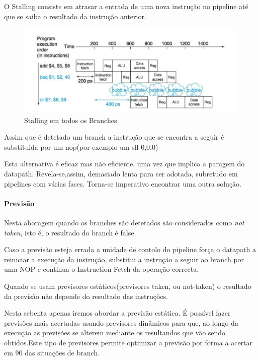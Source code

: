 \documentclass[10pt,a4paper]{book}
\begin{document}
				O Stalling consiste em atrasar a entrada de uma nova instrução no pipeline até que se saiba o resultado da instrução anterior.
        \begin{figure}[htp]
            \centering
            \includegraphics[scale=0.4]{pipeline2.png}
            \caption{Stalling em todos os Branches}
            \label{Stalling}
        \end{figure}
				Assim que é detetado um branch a instrução que se encontra a seguir é substituida por um nop(por exemplo um sll 0,0,0)

				Esta alternativa é eficaz mas não eficiente, uma vez que implica a paragem do datapath. Revela-se,assim, demasiado lenta para ser adotada, subretudo em pipelines com várias fases.
				Torna-se imperativo encontrar uma outra solução.

			\paragraph{Previsão}

				Nesta aboragem quando os branches são detetados são considerados como \textit{not taken}, isto é, o resultado do branch é false.

				Caso a previsão esteja errada a unidade de contolo do pipeline força o datapath a reiniciar a execução da instrução, substitui a instrução a seguir ao branch por uma NOP e continua o Instruction Fetch da operação correcta.

				Quando se usam previsores estáticos(previsores taken, ou not-taken) o resultado da previsão não depende do resultado das instruções.

				Nesta sebenta apenas iremos abordar a previsão estática. É possível fazer previsões mais acertadas usando previsores dinâmicos para que, ao longo da execução as previsões se alterem mediante os resultandos que vão sendo obtidos.Este tipo de previsores permite optimizar a previsão por forma a acertar em 90 das situações de branch.
\end{document}
